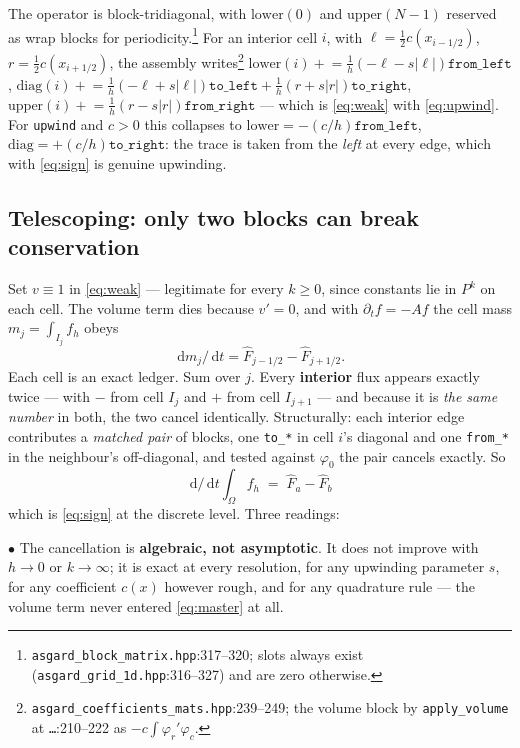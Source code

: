 \documentclass[10pt]{article}
\newcommand{\code}[1]{\texttt{#1}}
\newcommand{\dd}{\,\mathrm{d}}
\newcommand{\hF}{\widehat{F}}
\newcommand{\fl}[2]{\texttt{#1}:#2}
\begin{document}
The operator is block-tridiagonal, with $\mathrm{lower}(0)$ and
$\mathrm{upper}(N{-}1)$ reserved as wrap blocks for
periodicity.\footnote{\fl{asgard\_block\_matrix.hpp}{317--320}; slots always
exist (\fl{asgard\_grid\_1d.hpp}{316--327}) and are zero otherwise.} For an
interior cell $i$, with $\ell=\tfrac12c(x_{i-1/2})$, $r=\tfrac12c(x_{i+1/2})$,
the assembly writes\footnote{\fl{asgard\_coefficients\_mats.hpp}{239--249}; the
volume block by \code{apply\_volume} at \fl{\dots}{210--222} as
$-c\int\varphi_r'\varphi_c$.}
$\mathrm{lower}(i)\mathrel{+}=\tfrac1h(-\ell-s|\ell|)\code{from\_left}$,
$\mathrm{diag}(i)\mathrel{+}=\tfrac1h(-\ell+s|\ell|)\code{to\_left}
+\tfrac1h(r+s|r|)\code{to\_right}$,
$\mathrm{upper}(i)\mathrel{+}=\tfrac1h(r-s|r|)\code{from\_right}$ ---
which is \eqref{eq:weak} with \eqref{eq:upwind}. For \code{upwind} and $c>0$ this
collapses to $\mathrm{lower}=-(c/h)\code{from\_left}$,
$\mathrm{diag}=+(c/h)\code{to\_right}$: the trace is taken from the \emph{left}
at every edge, which with \eqref{eq:sign} is genuine upwinding.

\subsection{Telescoping: only two blocks can break conservation}
\label{sec:telescope}

Set $v\equiv1$ in \eqref{eq:weak} --- legitimate for every $k\ge0$, since
constants lie in $P^k$ on each cell. The volume term dies because $v'=0$, and
with $\partial_t f=-Af$ the cell mass $m_j=\int_{I_j}f_h$ obeys
\begin{equation}
  \dd m_j/\dd t = \hF_{j-1/2} - \hF_{j+1/2}.
  \label{eq:ledger}
\end{equation}
Each cell is an exact ledger. Sum over $j$. Every \textbf{interior} flux appears
exactly twice --- with $-$ from cell $I_j$ and $+$ from cell $I_{j+1}$ --- and
because it is \emph{the same number} in both, the two cancel identically.
Structurally: each interior edge contributes a \emph{matched pair} of blocks, one
\code{to\_*} in cell $i$'s diagonal and one \code{from\_*} in the neighbour's
off-diagonal, and tested against $\varphi_0$ the pair cancels exactly. So
\begin{equation}
  \boxed{\ \dd/\dd t\textstyle\int_\Omega f_h \;=\; \hF_a - \hF_b\ }
  \label{eq:master}
\end{equation}
which is \eqref{eq:sign} at the discrete level. Three readings:

$\bullet$ The cancellation is \textbf{algebraic, not asymptotic}. It does not
improve with $h\to0$ or $k\to\infty$; it is exact at every resolution, for any
upwinding parameter $s$, for any coefficient $c(x)$ however rough, and for any
quadrature rule --- the volume term never entered \eqref{eq:master} at all.
\end{document}
